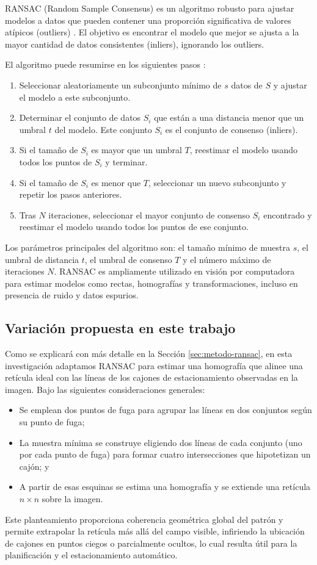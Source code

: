 

RANSAC (Random Sample Consensus) es un algoritmo robusto para ajustar modelos a datos que pueden contener una proporción significativa de valores atípicos (outliers) \cite{fischler1981ransac,hartley2003multiple}. El objetivo es encontrar el modelo que mejor se ajusta a la mayor cantidad de datos consistentes (inliers), ignorando los outliers.

El algoritmo puede resumirse en los siguientes pasos \cite[Alg. 4.4]{hartley2003multiple}:
\begin{enumerate}
	\item Seleccionar aleatoriamente un subconjunto mínimo de $s$ datos de $S$ y ajustar el modelo a este subconjunto.
	\item Determinar el conjunto de datos $S_i$ que están a una distancia menor que un umbral $t$ del modelo. Este conjunto $S_i$ es el conjunto de consenso (inliers).
	\item Si el tamaño de $S_i$ es mayor que un umbral $T$, reestimar el modelo usando todos los puntos de $S_i$ y terminar.
	\item Si el tamaño de $S_i$ es menor que $T$, seleccionar un nuevo subconjunto y repetir los pasos anteriores.
	\item Tras $N$ iteraciones, seleccionar el mayor conjunto de consenso $S_i$ encontrado y reestimar el modelo usando todos los puntos de ese conjunto.
\end{enumerate}

Los parámetros principales del algoritmo son: el tamaño mínimo de muestra $s$, el umbral de distancia $t$, el umbral de consenso $T$ y el número máximo de iteraciones $N$. RANSAC es ampliamente utilizado en visión por computadora para estimar modelos como rectas, homografías y transformaciones, incluso en presencia de ruido y datos espurios.


\subsection{Variación propuesta en este trabajo}\label{sec:aply-ransac}
Como se explicará con más detalle en la Sección \ref{sec:metodo-ransac}, 
en esta investigación adaptamos RANSAC para estimar una homografía que alinee una retícula ideal 
con las líneas de los cajones de estacionamiento observadas en la imagen. 
Bajo las siguientes consideraciones generales: 
\begin{itemize}
\item Se emplean dos puntos de fuga para agrupar las líneas en dos conjuntos según su punto de fuga; 
\item La muestra mínima se construye eligiendo dos líneas de cada conjunto (uno por cada punto de fuga) para formar cuatro intersecciones 
que hipotetizan un cajón; y 
\item A partir de esas esquinas se estima una homografía y se extiende una retícula \(n\times n\) 
sobre la imagen.
\end{itemize}

Este planteamiento proporciona coherencia geométrica global del patrón 
y permite extrapolar la retícula más allá del campo visible, infiriendo la ubicación de cajones 
en puntos ciegos o parcialmente ocultos, lo cual resulta útil para la planificación 
y el estacionamiento automático.
